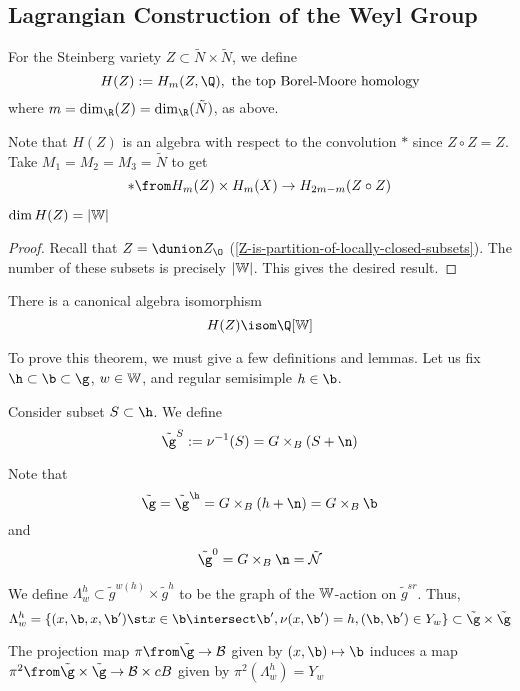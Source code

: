 \subsection{Lagrangian Construction of the Weyl Group}
\begin{defn}
  For the Steinberg variety \(Z \subset \tilde{N} \times \tilde{N}\),
  we define \[
    H(Z) := H_m(Z, \Q), \text{ the top Borel-Moore homology}
  \]
  where \(m = \dim_\R(Z) = \dim_\R(\tilde{N})\), as above.
\end{defn}
\begin{rmk}
  Note that \(H(Z)\) is an algebra with respect to the convolution
  \(*\) since \(Z \circ Z = Z\). Take \(M_1 = M_2 = M_3 = \tilde{N}\)
  to get \[
    * \from H_m(Z) \times H_m(X) \to H_{2m-m}(Z \circ Z)
  \]
\end{rmk}
\begin{prop}
  \(\dim H(Z) = |\mathbb{W}|\)
\end{prop}
\begin{proof}
  Recall that \(Z = \dunion Z_\O\)
  (\ref{Z-is-partition-of-locally-closed-subsets}). The number of
  these subsets is precisely \(|\mathbb{W}|\). This gives the desired result.
\end{proof}
\begin{thm}
  There is a canonical algebra isomorphism \[
    H(Z) \isom \Q[\W]
  \]
\end{thm}
To prove this theorem, we must give a few definitions and lemmas. Let
us fix \(\h \subset \b \subset \g\), \(w \in \mathbb{W}\), and regular
semisimple \(h \in \b\).
\begin{defn}
  Consider subset \(S \subset \h\). We define \[
    \tilde{\g}^S := \nu^{-1}(S) = G \times_B (S+\n)
  \]
\end{defn}
\begin{example}
  Note that \[
    \tilde{\g} = \tilde{\g}^\h = G \times_B (h + \n) = G \times_B \b
  \]
  and \[
    \tilde{\g}^0 = G \times_B \n = \tilde{\cN}
  \]
\end{example}
\begin{defn}
  We define \(\Lambda_w^h \subset \tilde{g}^{w(h)} \times \tilde{g}^h\)
  to be the graph of the \(\mathbb{W}\)-action on \(\tilde{g}^{sr}\). Thus, \[
    \Lambda_w^h = \{(x,\b,x,\b') \st x \in \b \intersect \b',
    \nu(x,\b') = h, (\b,\b') \in Y_w\} \subset \tilde{\g} \times \tilde{\g}
  \]
\end{defn}
\begin{prop}
  The projection map \(\pi \from \tilde{\g} \to \cB\) given by
  \((x,\b) \mapsto \b\) induces a map \(\pi^2 \from \tilde{\g} \times
  \tilde{\g} \to \cB \times cB\) given by \(\pi^2(\Lambda_w^h) = Y_w\)
\end{prop}
